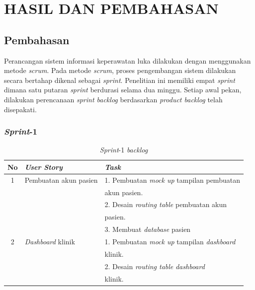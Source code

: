 
\chapter{HASIL DAN PEMBAHASAN}

\section{Pembahasan}

Perancangan sistem informasi keperawatan luka dilakukan dengan menggunakan metode \emph{scrum}. Pada metode \emph{scrum}, proses pengembangan sistem dilakukan secara bertahap dikenal sebagai \emph{sprint}. Penelitian ini memiliki empat \emph{sprint} dimana satu putaran \emph{sprint} berdurasi selama dua minggu. Setiap awal pekan, dilakukan perencanaan \emph{sprint backlog} berdasarkan \emph{product backlog} telah disepakati.

\subsection{\emph{Sprint}-1}

\begin{table}[H]
	\centering
	\caption{\emph{Sprint}-1 \emph{backlog}}
	\label{tabel_input}
	\begin{tabular}{|c|l|l|}
		\hline
		\textbf{No} & \textbf{\emph{User Story}} & \textbf{\emph{Task}} \\
		\hline
		
		1 & 
		Pembuatan akun pasien & 
		1. Pembuatan \emph{mock up} tampilan pembuatan\\
		
		& 
		& 
		akun pasien.\\
		
		& 
		& 
		2. Desain \emph{routing table} pembuatan akun\\
		
		& 
		& 
		pasien.\\
		
		& 
		& 
		3. Membuat \emph{database} pasien\\
		\hline
		
		2 & 
		\emph{Dashboard} klinik & 
		1. Pembuatan \emph{mock up} tampilan \emph{dashboard}\\
		
		& 
		& 
		klinik.\\
		
		& 
		& 
		2. Desain \emph{routing table} \emph{dashboard}\\
		
		& 
		& 
		klinik.\\
		\hline
		
	\end{tabular}
\end{table}

